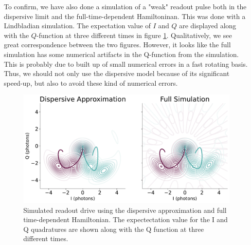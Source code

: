 To confirm, we have also done a simulation of a "weak" readout pulse both in the dispersive limit and the full-time-dependent Hamiltoninan. This was done with a Lindbladian simulation. The expectation value of $I$ and $Q$ are displayed along with the $Q$-function at three different times in figure \ref{fig:dispersive_slash_full_readout}. Qualitatively, we see great correspondence between the two figures. However, it looks like the full simulation has some numerical artifacts in the Q-function from the simulation. This is probably due to built up of small numerical errors in a fast rotating basis. Thus, we should not only use the dispersive model because of its significant speed-up, but also to avoid these kind of numerical errors.

\begin{figure}
    \centering
    \includegraphics[width = \textwidth]{Simulations/readout_simulations/figures/dispersive_approx.pdf}
    \caption{Simulated readout drive using the dispersive approximation and full time-dependent Hamiltonian. The expectectation value for the I and Q quadratures are shown along with the Q function at three different times.}
    \label{fig:dispersive_slash_full_readout}
\end{figure}



